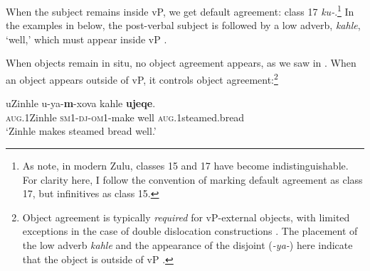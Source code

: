 \documentclass[output=paper,colorlinks,citecolor=brown]{langscibook}
\begin{document}
\ea%
    \label{ex:halpert:2}
\z 
\z 

When the subject remains inside vP, we get default agreement: class 17 \textit{ku-}.\footnote{As \citet{BuellDreu2013} note, in modern Zulu, classes 15 and 17 have become indistinguishable. For clarity here, I follow the convention of marking default agreement as class 17, but infinitives as class 15.}  In the examples in  below, the post-verbal subject is followed by a low adverb, \textit{kahle}, `well,' which must appear inside vP \citep{Buell2005}.

\ea%
    \label{ex:halpert:3}
    \z 
\z 

When objects remain in situ, no object agreement appears, as we saw in . When an object appears outside of vP, it controls object agreement:\footnote{Object agreement is typically \textit{required} for vP-external objects, with limited exceptions in the case of double dislocation constructions \cite[e.g.][]{Adams2010,Zeller2012}.  The placement of the low adverb \textit{kahle} and the appearance of the  disjoint  (\textit{-ya-}) here indicate that the object is outside of vP \citep{Buell2005,Halpert2015}.}

\ea%
    \label{ex:halpert:4}
    \gll    uZinhle u-ya-\textbf{m}-xova kahle  \textbf{ujeqe}.\\
            \textsc{aug}.1Zinhle \textsc{sm}1-\textsc{dj}-\textsc{om}1-make well  \textsc{aug}.1steamed.bread\\ 
    \glt    `Zinhle makes steamed bread well.'
\z 
\end{document}

